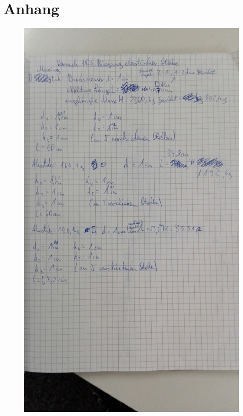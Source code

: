 \documentclass[
  bibliography=totoc,     %
  captions=tableheading,  %
  titlepage=firstiscover, %
]{scrartcl}
\begin{document}
\section{Anhang}
\begin{figure}[H]
    \centering
    \includegraphics[width=1\textwidth]{V1034.jpeg}
    \label{fig:1034}
\end{figure}\begin{figure}[H]
    \centering

\end{figure}
\end{document}
